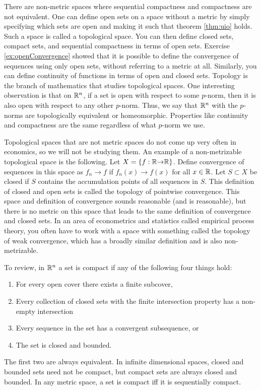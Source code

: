 \begin{remark}
  There are non-metric spaces where sequential compactness and
  compactness are not equivalent. One can define open sets on a space
  without a metric by simply specifying which sets are open and making
  it such that theorem \ref{thm:uio} holds. Such a space is called a
  topological space. You can then define closed sets, compact sets,
  and sequential compactness in terms of open sets.  Exercise
  \ref{ex:openConvergence} showed that it is possible to define the
  convergence of sequences using only open sets, without referring to
  a metric at all. Similarly, you can define continuity of functions
  in terms of open and closed sets. Topology is the branch of
  mathematics that studies topological spaces. One interesting
  observation is that on $\mathbb{R}^n$, if a set is open with respect to some
  $p$-norm, then it is also open with respect to any other
  $p$-norm. Thus, we say that $\mathbb{R}^n$ with the $p$-norms are
  topologically equivalent or homeomorphic. Properties like continuity
  and compactness are the same regardless of what $p$-norm we use.
  
  Topological spaces that are not metric spaces do not come up very
  often in economics, so we will not be studying them. An example of a
  non-metrizable topological space is the following. Let
  $X = \{f: \mathbb{R} {\rightarrow} \mathbb{R}\}$. Define convergence of sequences in this
  space as $f_n \to f$ if $f_n(x) \to f(x)$ for all $x \in \mathbb{R}$. Let
  $S \subset X$ be closed if $S$ contains the accumulation points of
  all sequences in $S$. This definition of closed and open sets is
  called the topology of pointwise convergence. This space and
  definition of convergence sounds reasonable (and is reasonable), but
  there is no metric on this space that leads to the same definition
  of convergence and closed sets. In an area of econometrics and
  statistics called empirical process theory, you often have to work
  with a space with something called the topology of weak convergence,
  which has a broadly similar definition and is also non-metrizable.
\end{remark}

To review, in $\mathbb{R}^n$ a set is compact if any of the following four
things hold:
\begin{enumerate}
\item For every open cover there exists a finite subcover,
\item Every collection of closed sets with the finite intersection
  property has a non-empty intersection
\item Every sequence in the set has a convergent subsequence, or
\item The set is closed and bounded.
\end{enumerate}
The first two are always equivalent. 
In infinite dimensional spaces, closed and bounded sets need not be
compact, but compact sets are always closed and bounded. In any metric
space, a set is compact iff it is sequentially compact.

